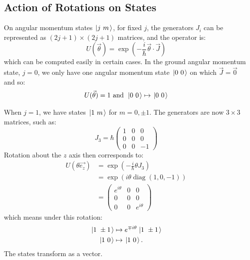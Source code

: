 \documentclass[../Main.tex]{subfiles}
\begin{document}
\subsection{Action of Rotations on States}
On angular momentum states $\left.\left|j~m\right.\right\rangle$, for fixed $j$, the generators $J_i$ can be represented as $(2j+1) \times (2j+1)$ matrices, and the operator is:
\begin{equation*}
    U(\vec \theta) = \exp\left(-\frac i \hbar \vec{\theta} \cdot \vec{J}\right)
\end{equation*}
which can be computed easily in certain cases. In the ground angular momentum state, $j = 0$, we only have one angular momentum state $\left.\left|0~0\right.\right\rangle$ on which $\vec J = \vec0$ and so:
\begin{equation*}
    U(\vec \theta) = 1 \text{ and } \left.\left|0~0\right.\right\rangle \mapsto \left.\left|0~0\right.\right\rangle
\end{equation*}

When $j = 1$, we have states $\left.\left|1~m\right.\right\rangle$ for $m = 0, \pm 1$. The generators are now $3\times3$ matrices, such as:
\begin{equation*}
    J_3 = \hbar \begin{pmatrix}
        1 & 0 & 0 \\
        0 & 0 & 0 \\
        0 & 0 & -1
    \end{pmatrix}
\end{equation*}
Rotation about the $z$ axis then corresponds to:
\begin{align*}
    U(\theta \vec{e_z}) &= \exp\left(-\frac i \hbar \theta J_3\right) \\
    &= \exp(i\theta \operatorname{diag}(1, 0, -1)) \\
    &= \begin{pmatrix}
        e^{i\theta} & 0 & 0 \\
        0 & 0 & 0 \\
        0 & 0 & e^{i\theta}
    \end{pmatrix}
\end{align*}
which means under this rotation:
\begin{align*}
    \left.\left|1~\pm 1\right.\right\rangle &\mapsto e^{\mp i\theta}\left.\left|1~\pm 1\right.\right\rangle \\
    \left.\left|1~0\right.\right\rangle &\mapsto \left.\left|1~0\right.\right\rangle.
\end{align*}
The states transform as a vector.
\end{document}
